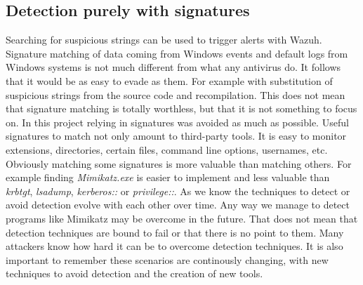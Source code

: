 \subsection{Detection purely with signatures}
Searching for suspicious strings can be used to trigger alerts with Wazuh.
Signature matching of data coming from Windows events and default logs from Windows systems is not much different from what any antivirus do. It follows that it would be as easy to evade as them. For example with substitution of suspicious strings from the source code and recompilation\cite{understanding_powersploit_mimikatz}.
\linej
\linej
This does not mean that signature matching is totally worthless, but that it is not something to focus on. In this project relying in signatures was avoided as much as possible.
Useful signatures to match not only amount to third-party tools. It is easy to monitor extensions, directories, certain files, command line options, usernames, etc.
\linej
Obviously matching some signatures is more valuable than matching others. For example finding \textit{Mimikatz.exe} is easier to implement and less valuable than \textit{krbtgt}, \textit{lsadump}, \textit{kerberos::} or \textit{privilege::}.
\linej
\linej
As we know the techniques to detect or avoid detection evolve with each other over time.
Any way we manage to detect programs like Mimikatz may be overcome in the future.
\linej
That does not mean that detection techniques are bound to fail or that there is no point to them.
Many attackers know how hard it can be to overcome detection techniques.
\linej
It is also important to remember these scenarios are continously changing, with new techniques to avoid detection and the creation of new tools.

